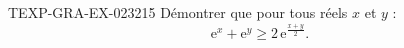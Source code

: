 \begin{exercice}{TEXP-GRA-EX-023}{2}{15}
Démontrer que pour tous réels $x$ et $y$ :
\[ \mathrm{e}^x + \mathrm{e}^y \geq 2\,\mathrm{e}^{\frac{x+y}{2}}. \]

\end{exercice}

